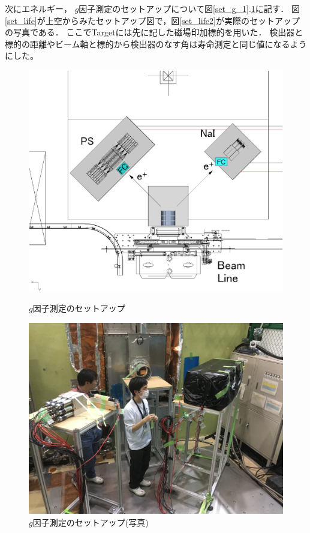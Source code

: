 次にエネルギー， $g$因子測定のセットアップについて図\ref{set_g_1}.\ref{set_g_2}に記す．
図\ref{set_life}が上空からみたセットアップ図で，図\ref{set_life2}が実際のセットアップの写真である．
ここでTargetには先に記した磁場印加標的を用いた．
検出器と標的の距離やビーム軸と標的から検出器のなす角は寿命測定と同じ値になるようにした。
\begin{figure}[H]
  \begin{minipage}{0.45\hsize}
    \begin{center}
      \includegraphics[width=1\textwidth]{figure/tajima/g-2_3.png}
      \caption{$g$因子測定のセットアップ}
      \label{set_g_1}
    \end{center}
  \end{minipage}
  \begin{minipage}{0.45\hsize}
    \begin{center}
      \includegraphics[width=1.1\textwidth]{figure/tajima/g.jpg}
      \caption{$g$因子測定のセットアップ(写真)}
      \label{set_g_2}
    \end{center}
  \end{minipage}
\end{figure}
